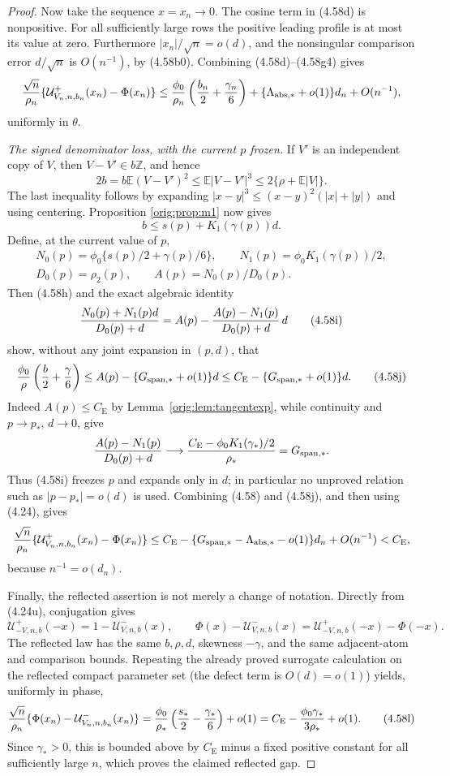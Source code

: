 \documentclass[11pt,a4paper]{article}
\numberwithin{equation}{section}
\theoremstyle{definition}
\theoremstyle{remark}
\newcommand{\E}{\mathbb E}
\newcommand{\CE}{C_{\mathrm E}}
\begin{document}
\begin{proof}
Now take the sequence \(x=x_n\to0\).  The cosine term in (4.58d) is
nonpositive.  For all sufficiently large rows the positive leading
profile is at most its value at zero.  Furthermore
\(|x_n|/\sqrt n=o(d)\), and the nonsingular comparison error
\(d/\sqrt n\) is \(O(n^{-1})\), by (4.58b0).  Combining
(4.58d)--(4.58g4) gives
\[
 {\sqrt n\over\rho_n}
 \{\mathcal U^+_{V_n,n,b_n}(x_n)-\Phi(x_n)\}
 \le {\phi_0\over\rho_n}\left({b_n\over2}
                       +{\gamma_n\over6}\right)
       +\{\Lambda_{\rm abs,*}+o(1)\}d_n+O(n^{-1}),
\]
uniformly in \(\theta\).

\emph{The signed denominator loss, with the current \(p\) frozen.}
If \(V'\) is an independent copy of \(V\), then
\(V-V'\in b\mathbb Z\), and hence
\[
 2b=b\E(V-V')^2\le\E|V-V'|^3
       \le2\{\rho+\E|V|\}.
\]
The last inequality follows by expanding
\(|x-y|^3\le(x-y)^2(|x|+|y|)\) and using centering.  Proposition
\ref{orig:prop:m1} now gives
\[
                       b\le s(p)+K_1(\gamma(p))d.     \tag{4.58h}
\]
Define, at the current value of \(p\),
\[
 \begin{gathered}
 N_0(p)=\phi_0\{s(p)/2+\gamma(p)/6\},\qquad
 N_1(p)=\phi_0K_1(\gamma(p))/2,\\
 D_0(p)=\rho_2(p),\qquad A(p)=N_0(p)/D_0(p).
 \end{gathered}
\]
Then (4.58h) and the exact algebraic identity
\[
 {N_0(p)+N_1(p)d\over D_0(p)+d}
 =A(p)-{A(p)-N_1(p)\over D_0(p)+d}\,d               \tag{4.58i}
\]
show, without any joint expansion in \((p,d)\), that
\[
 {\phi_0\over\rho}\left({b\over2}+{\gamma\over6}\right)
 \le A(p)-\{G_{\rm span,*}+o(1)\}d
 \le \CE-\{G_{\rm span,*}+o(1)\}d.                 \tag{4.58j}
\]
Indeed \(A(p)\le\CE\) by Lemma~\ref{orig:lem:tangentexp}, while continuity
and \(p\to p_*\), \(d\to0\), give
\[
 {A(p)-N_1(p)\over D_0(p)+d}
 \longrightarrow {\CE-\phi_0K_1(\gamma_*)/2\over\rho_*}
 =G_{\rm span,*}.
\]
Thus (4.58i) freezes \(p\) and expands only in \(d\); in particular no
unproved relation such as \(|p-p_*|=o(d)\) is used.  Combining (4.58)
and (4.58j), and then using (4.24), gives
\[
 {\sqrt n\over\rho_n}
 \{\mathcal U^+_{V_n,n,b_n}(x_n)-\Phi(x_n)\}
 \le\CE-\{G_{\rm span,*}-\Lambda_{\rm abs,*}-o(1)\}d_n
       +O(n^{-1})<\CE,
\]
because \(n^{-1}=o(d_n)\).

Finally, the reflected assertion is not merely a change of notation.
Directly from (4.24u), conjugation gives
\[
 \mathcal U^+_{-V,n,b}(-x)=1-\mathcal U^-_{V,n,b}(x),
 \qquad
 \Phi(x)-\mathcal U^-_{V,n,b}(x)
 =\mathcal U^+_{-V,n,b}(-x)-\Phi(-x).                \tag{4.58k}
\]
The reflected law has the same \(b,\rho,d\), skewness \(-\gamma\), and
the same adjacent-atom and comparison bounds.  Repeating the already
proved surrogate calculation on the reflected compact parameter set (the
defect term is \(O(d)=o(1)\)) yields, uniformly in phase,
\[
 {\sqrt n\over\rho_n}
 \{\Phi(x_n)-\mathcal U^-_{V_n,n,b_n}(x_n)\}
 ={\phi_0\over\rho_*}\left({s_*\over2}-{\gamma_*\over6}\right)
       +o(1)
 =\CE-{\phi_0\gamma_*\over3\rho_*}+o(1).             \tag{4.58l}
\]
Since \(\gamma_*>0\), this is bounded above by \(\CE\) minus a fixed
positive constant for all sufficiently large \(n\), which proves the
claimed reflected gap.
\end{proof}
\end{document}

